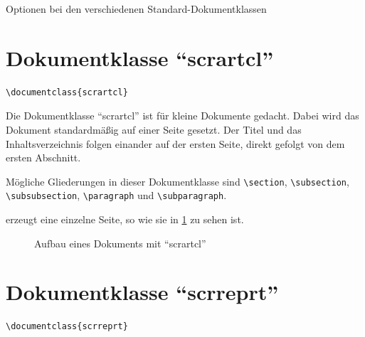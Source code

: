 \begin{table}[htbp]
	\caption{Optionen bei den verschiedenen Standard-Dokumentklassen}
	\label{tab:classoptions}
\end{table}

\section{Dokumentklasse \enquote{scrartcl}}

\begin{lstlisting}
\documentclass{scrartcl}
\end{lstlisting}

Die Dokumentklasse \enquote{scrartcl} ist für kleine Dokumente gedacht. Dabei wird das Dokument standardmäßig auf einer Seite gesetzt. Der Titel und das Inhaltsverzeichnis folgen einander auf der ersten Seite, direkt gefolgt von dem ersten Abschnitt.

Mögliche Gliederungen in dieser Dokumentklasse sind \texttt{\textbackslash section}, \texttt{\textbackslash subsection},
\\
\texttt{\textbackslash subsubsection}, \texttt{\textbackslash paragraph} und \texttt{\textbackslash subparagraph}.

 erzeugt eine einzelne Seite, so wie sie in \cref{fig:article} zu sehen ist.

\begin{figure}[htb]
	\begin{center}
	\end{center}
	\caption{Aufbau eines Dokuments mit \enquote{scrartcl}}
	\label{fig:article}
\end{figure}

\section{Dokumentklasse \enquote{scrreprt}}

\begin{lstlisting}
\documentclass{scrreprt}
\end{lstlisting}

